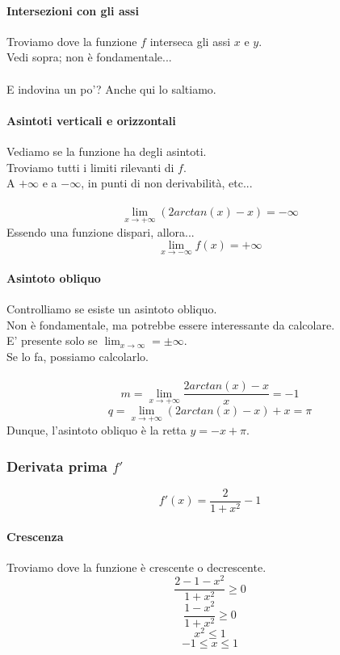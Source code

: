 \documentclass{article}
\begin{document}
\paragraph{Intersezioni con gli assi}
Troviamo dove la funzione \(f\) interseca gli assi \(x\) e \(y\).\\
Vedi sopra; non è fondamentale...\\\\
E indovina un po'? Anche qui lo saltiamo.

\paragraph{Asintoti verticali e orizzontali}
Vediamo se la funzione ha degli asintoti.\\
Troviamo tutti i limiti rilevanti di \(f\).\\
A \(+\infty\) e a \(-\infty\), in punti di non derivabilità, etc...\\\\
\[\lim_{x \to +\infty} (2 arctan(x) - x) = -\infty\]
Essendo una funzione dispari, allora...
\[\lim_{x \to -\infty} f(x) = +\infty\]

\paragraph{Asintoto obliquo}
Controlliamo se esiste un asintoto obliquo.\\
Non è fondamentale, ma potrebbe essere interessante da calcolare.\\
E' presente solo se \(\lim_{x \to \infty} = \pm\infty\).\\
Se lo fa, possiamo calcolarlo.\\\\
\[m = \lim_{x \to +\infty} \frac{2 arctan(x) - x}{x} = -1\]
\[q = \lim_{x \to +\infty} (2 arctan(x) - x) + x = \pi\]
Dunque, l'asintoto obliquo è la retta \(y = -x + \pi\).

\subsubsection{Derivata prima \(f'\)}
\[f'(x) = \frac{2}{1 + x^2} - 1\]

\paragraph{Crescenza}
Troviamo dove la funzione è crescente o decrescente.\\
\[\frac{2 - 1 - x^2}{1 + x^2} \geq 0\]
\[\frac{1 - x^2}{1 + x^2} \geq 0\]
\[x^2 \leq 1\]
\[-1 \leq x \leq 1\]
\end{document}
